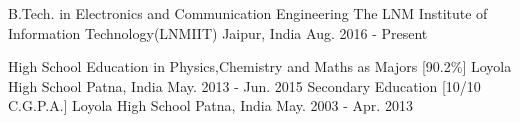 

\begin{cventries}

  \cventry
    {B.Tech. in Electronics and Communication Engineering} %
    {The LNM Institute of Information Technology(LNMIIT)} %
    {Jaipur, India} %
    {Aug. 2016 - Present} %
    {
    }

	\cventry
    {High School Education in Physics,Chemistry and Maths as Majors [90.2\%]} %
    {Loyola High School} %
    {Patna, India} %
    {May. 2013 - Jun. 2015} %
    {
    }
		\cventry
    {Secondary Education [10/10 C.G.P.A.]} %
    {Loyola High School} %
    {Patna, India} %
    {May. 2003 - Apr. 2013} %
    {
    }

\end{cventries}


